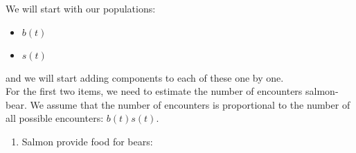 \begin{example}
We will start with our populations:
\begin{itemize}
	\item $b(t)$
	\item $s(t)$
\end{itemize}
and we will start adding components to each of these one by one. \\

For the first two items, we need to estimate the number of encounters salmon-bear. We assume that the number of encounters is proportional to the number of all possible encounters: $b(t) s(t)$.

\begin{enumerate}
	\item Salmon provide food for bears: 
\end{enumerate}

\end{example}


